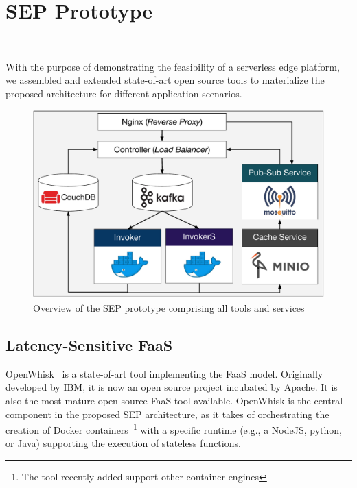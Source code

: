 \section{SEP Prototype}~\label{sec:prototype}

With the purpose of demonstrating the feasibility of a serverless edge platform, we assembled and extended state-of-art open source tools to materialize the proposed architecture for different application scenarios.

\begin{figure}[tbp]
	\centering
	\includegraphics[width=1\linewidth]{Figs/Serverless_Edge_Platform_Prototype.pdf}
	\caption{Overview of the SEP prototype comprising all tools and services}
	\label{fig:Serverless_Edge_Platform_Overview}
\end{figure}

\subsection{Latency-Sensitive FaaS}

OpenWhisk~\cite{OpenWhisk} is a state-of-art tool implementing the FaaS model. Originally developed by IBM, it is now an open source project incubated by Apache. It is also the most mature open source FaaS tool available. OpenWhisk is the central component in the proposed SEP architecture, 
as it takes of orchestrating the creation of Docker containers~\footnote{The tool recently added support other container engines} with a specific runtime (e.g., a NodeJS, python, or Java) supporting the execution of stateless functions.

